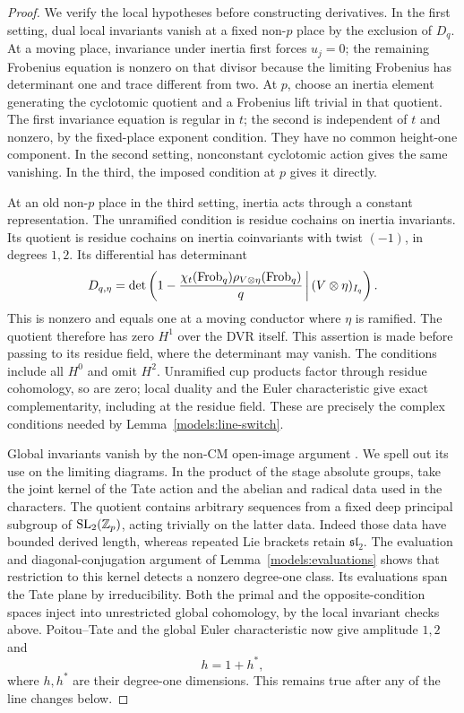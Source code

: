 \begin{proof}
We verify the local hypotheses before constructing derivatives.
In the first setting, dual local invariants vanish at a fixed
non-\(p\) place by the exclusion of \(D_q\).  At a moving place,
invariance under inertia first forces \(u_j=0\); the remaining
Frobenius equation is nonzero on that divisor because the limiting
Frobenius has determinant one and trace different from two.
At \(p\), choose an inertia element generating the cyclotomic
quotient and a Frobenius lift trivial in that quotient.  The first
invariance equation is regular in \(t\); the second is independent
of \(t\) and nonzero, by the fixed-place exponent condition.  They
have no common height-one component.  In the second setting,
nonconstant cyclotomic action gives the same vanishing.  In the
third, the imposed condition at \(p\) gives it directly.

At an old non-\(p\) place in the third setting, inertia acts through
a constant representation.  The unramified condition is residue
cochains on inertia invariants.  Its quotient is residue cochains
on inertia coinvariants with twist \((-1)\), in degrees \(1,2\).
Its differential has determinant
\[
 D_{q,\eta}=\det\left(1-\frac{\chi_t(\operatorname{Frob}_q)
                     \rho_{V\otimes\eta}(\operatorname{Frob}_q)}q
                         \,\middle|\,(V\otimes\eta)_{I_q}\right).
\]
This is nonzero and equals one at a moving conductor where \(\eta\)
is ramified.  The quotient therefore has zero \(H^1\) over the
DVR itself.  This assertion is made before passing to its residue
field, where the determinant may vanish.  The conditions include
all \(H^0\) and omit \(H^2\).  Unramified cup products factor through
residue cohomology, so are zero; local duality and the Euler
characteristic give exact complementarity, including at the
residue field.  These are precisely the complex conditions needed
by Lemma~\ref{models:line-switch}.

Global invariants vanish by the non-CM open-image argument
\cite{Serre}.  We spell out its use on the limiting diagrams.  In
the product of the stage absolute groups, take the joint kernel of
the Tate action and the abelian and radical data used in the
characters.  The quotient contains arbitrary sequences from a
fixed deep principal subgroup of \(\operatorname{SL}_2(\mathbb Z_p)\),
acting trivially on the latter data.  Indeed those data have
bounded derived length, whereas repeated Lie brackets retain
\(\mathfrak{sl}_2\).  The evaluation and diagonal-conjugation
argument of Lemma~\ref{models:evaluations} shows that restriction to
this kernel detects a nonzero degree-one class.  Its evaluations
span the Tate plane by irreducibility.  Both the primal and the
opposite-condition spaces inject into unrestricted global
cohomology, by the local invariant checks above.  Poitou--Tate and
the global Euler characteristic now give amplitude \(1,2\) and
\[
 h=1+h^*,
\]
where \(h,h^*\) are their degree-one dimensions.  This remains
true after any of the line changes below.


\end{proof}
